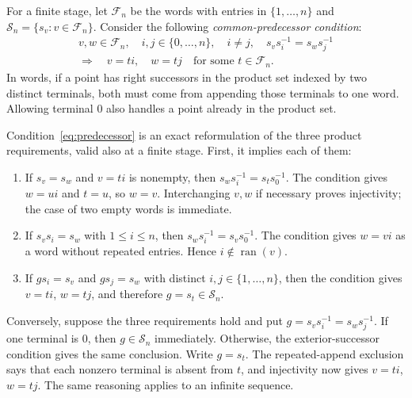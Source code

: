 \documentclass[11pt,letterpaper]{amsart}
\theoremstyle{definition}
\theoremstyle{remark}
\DeclareMathOperator{\ran}{ran}
\begin{document}
For a finite stage, let $\mathcal F_n$ be the words with entries in
$\{1,\ldots,n\}$ and $\mathcal S_n=\{s_v:v\in\mathcal F_n\}$.
Consider the following \emph{common-predecessor condition}:
\begin{equation}\label{eq:predecessor}
 \begin{gathered}
 v,w\in\mathcal F_n,\quad i,j\in\{0,\ldots,n\},\quad i\ne j,
 \quad s_vs_i^{-1}=s_ws_j^{-1}\\
 \Longrightarrow\quad v=ti,\quad w=tj
 \quad\text{for some }t\in\mathcal F_n.
 \end{gathered}
\end{equation}
In words, if a point has right successors in the product set indexed
by two distinct terminals, both must come from appending those terminals to one
word. Allowing terminal $0$ also handles a point already in the
product set.

Condition~\eqref{eq:predecessor} is an exact reformulation of the
three product requirements, valid also at a finite stage. First,
it implies each of them:
\begin{enumerate}
\item If $s_v=s_w$ and $v=ti$ is nonempty, then
$s_ws_i^{-1}=s_ts_0^{-1}$. The condition gives $w=ui$ and $t=u$,
so $w=v$. Interchanging $v,w$ if necessary proves injectivity;
the case of two empty words is immediate.
\item If $s_vs_i=s_w$ with $1\leq i\leq n$, then
$s_ws_i^{-1}=s_vs_0^{-1}$. The condition gives $w=vi$ as a word
without repeated entries. Hence $i\notin\ran(v)$.
\item If $gs_i=s_v$ and $gs_j=s_w$ with distinct $i,j\in\{1,\ldots,n\}$, then the condition
gives $v=ti$, $w=tj$, and therefore $g=s_t\in\mathcal S_n$.
\end{enumerate}
Conversely, suppose the three requirements hold and put
$g=s_vs_i^{-1}=s_ws_j^{-1}$. If one terminal is $0$, then
$g\in\mathcal S_n$ immediately. Otherwise, the exterior-successor
condition gives the same conclusion. Write $g=s_t$.
The repeated-append exclusion says that each nonzero terminal is
absent from $t$, and injectivity now gives $v=ti$, $w=tj$.
The same reasoning applies to an infinite sequence.
\end{document}
